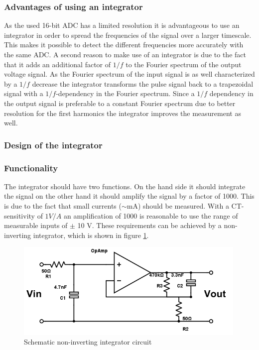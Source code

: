 \subsubsection{Advantages of using an integrator}
As the used 16-bit ADC has a limited resolution it is advantageous to use an integrator in order to spread the frequencies of the signal over a larger timescale. This makes it possible to detect the different frequencies more accurately with the same ADC. 
A second reason to make use of an integrator is due to the fact that it adds an additional factor of $1/f$ to the Fourier spectrum of the output voltage signal. As the Fourier spectrum of the input signal is as well characterized by a $1/f$ decrease the integrator transforms the pulse signal back to a trapezoidal signal with a $1/f$-dependency in the Fourier spectrum. Since a $1/f$ dependency in the output signal is preferable to a constant Fourier spectrum due to better resolution for the first harmonics the integrator improves the measurement as well. 

\subsubsection{Design of the integrator}
\subsubsection{Functionality}
The integrator should have two functions. On the hand side it should integrate the signal on the other hand it should amplify the signal by a factor of 1000. This is due to the fact that small currents ($\sim$mA) should be measured. With a CT-sensitivity of $1V/A$ an amplification of 1000 is reasonable to use the range of measurable inputs of $\pm$ 10 V. \footnotemark These requirements can be achieved by a non-inverting integrator, which is shown in figure  \ref{fig.circuit}. 
\begin{figure}[H]
\includegraphics[width=0.99\textwidth]{figures/Method/integrator/circuit.png}
    \caption{Schematic non-inverting integrator circuit}
    \label{fig.circuit}
\end{figure}	


